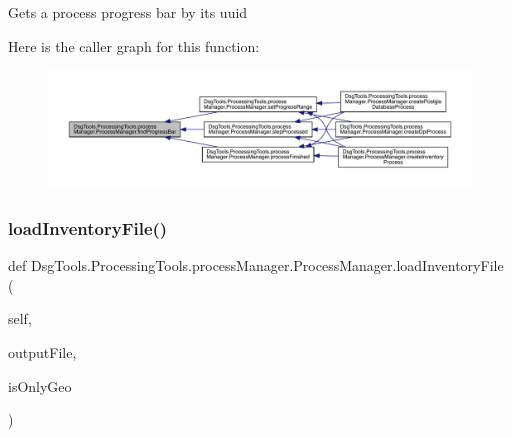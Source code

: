 \begin{DoxyVerb}Gets a process progress bar by its uuid
\end{DoxyVerb}
 Here is the caller graph for this function\+:
\nopagebreak
\begin{figure}[H]
\begin{center}
\leavevmode
\includegraphics[width=350pt]{class_dsg_tools_1_1_processing_tools_1_1process_manager_1_1_process_manager_ab6a56eaab22e457bcb0eb8a9f70e3e05_icgraph}
\end{center}
\end{figure}
\mbox{\label{class_dsg_tools_1_1_processing_tools_1_1process_manager_1_1_process_manager_a0c50cae9890b30ee3d01b34622ca0dbb}} 
\subsubsection{\texorpdfstring{load\+Inventory\+File()}{loadInventoryFile()}}
{\footnotesize\ttfamily def Dsg\+Tools.\+Processing\+Tools.\+process\+Manager.\+Process\+Manager.\+load\+Inventory\+File (\begin{DoxyParamCaption}\item[{}]{self,  }\item[{}]{output\+File,  }\item[{}]{is\+Only\+Geo }\end{DoxyParamCaption})}

